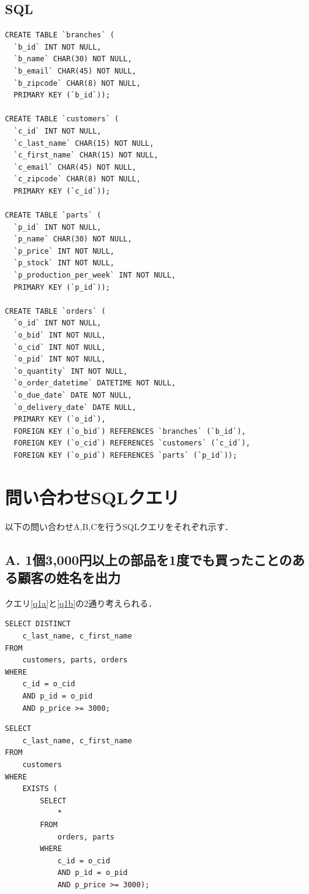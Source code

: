 \documentclass{jsarticle}
\begin{document}
\subsection{SQL}
\begin{lstlisting}[caption=スキーマのクエリ, label=schema]
CREATE TABLE `branches` (
  `b_id` INT NOT NULL,
  `b_name` CHAR(30) NOT NULL,
  `b_email` CHAR(45) NOT NULL,
  `b_zipcode` CHAR(8) NOT NULL,
  PRIMARY KEY (`b_id`));

CREATE TABLE `customers` (
  `c_id` INT NOT NULL,
  `c_last_name` CHAR(15) NOT NULL,
  `c_first_name` CHAR(15) NOT NULL,
  `c_email` CHAR(45) NOT NULL,
  `c_zipcode` CHAR(8) NOT NULL,
  PRIMARY KEY (`c_id`));

CREATE TABLE `parts` (
  `p_id` INT NOT NULL,
  `p_name` CHAR(30) NOT NULL,
  `p_price` INT NOT NULL,
  `p_stock` INT NOT NULL,
  `p_production_per_week` INT NOT NULL,
  PRIMARY KEY (`p_id`));

CREATE TABLE `orders` (
  `o_id` INT NOT NULL,
  `o_bid` INT NOT NULL,
  `o_cid` INT NOT NULL,
  `o_pid` INT NOT NULL,
  `o_quantity` INT NOT NULL,
  `o_order_datetime` DATETIME NOT NULL,
  `o_due_date` DATE NOT NULL,
  `o_delivery_date` DATE NULL,
  PRIMARY KEY (`o_id`),
  FOREIGN KEY (`o_bid`) REFERENCES `branches` (`b_id`),
  FOREIGN KEY (`o_cid`) REFERENCES `customers` (`c_id`),
  FOREIGN KEY (`o_pid`) REFERENCES `parts` (`p_id`));
\end{lstlisting}

\section{問い合わせSQLクエリ}
以下の問い合わせA,B,Cを行うSQLクエリをそれぞれ示す．

\subsection{A. 1個3,000円以上の部品を1度でも買ったことのある顧客の姓名を出力}
クエリ\ref{q1a}と\ref{q1b}の2通り考えられる．

\begin{lstlisting}[caption=問い合わせAのクエリ(1), label=q1a]
SELECT DISTINCT
    c_last_name, c_first_name
FROM
    customers, parts, orders
WHERE
    c_id = o_cid
	AND p_id = o_pid
    AND p_price >= 3000;
\end{lstlisting}

\begin{lstlisting}[caption=問い合わせAのクエリ(2), label=q1b]
SELECT
    c_last_name, c_first_name
FROM
    customers
WHERE
    EXISTS (
        SELECT
            *
        FROM
            orders, parts
        WHERE
            c_id = o_cid
            AND p_id = o_pid
            AND p_price >= 3000);
\end{lstlisting}
\end{document}
